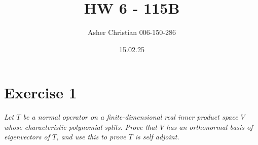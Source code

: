 \documentclass{article}
\title{HW 6 - 115B}
\author{Asher Christian 006-150-286}
\date{ 15.02.25}
\begin{document}
    \maketitle
    \section{Exercise 1}
    \emph{
        Let $T$ be a normal operator on a finite-dimensional real inner product space $V$ 
        whose characteristic polynomial splits. Prove that $V$ has an orthonormal basis
        of eigenvectors of $T$, and use this to prove $T$ is self adjoint.
    }
\end{document}
